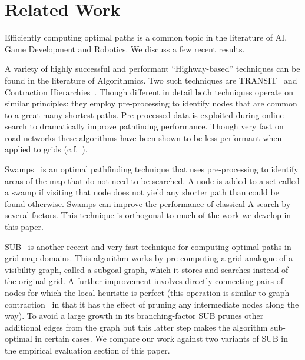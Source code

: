 \section{Related Work}
\label{sec::relatedwork}
Efficiently computing optimal paths is a common topic
in the literature of AI, Game Development and 
Robotics. We discuss a few recent results.

A variety of highly successful and performant ``Highway-based'' 
techniques can be found in the literature of Algorithmics. 
Two such techniques are TRANSIT~\cite{bast06} and Contraction
Hierarchies~\cite{geisberger08}. Though different in detail
both techniques operate on similar principles: they employ
pre-processing to identify nodes that
are common to a great many shortest paths. Pre-processed data is
exploited during online search to dramatically improve pathfindng 
performance. Though very fast on road networks these algorithms have
been shown to be less performant when applied to grids 
(c.f.~\cite{sturtevant10,antsfeld12,storandt13}).

Swamps~\cite{pochter10} is an optimal pathfinding technique
that uses pre-processing to identify areas of the map that do 
not need to be searched. A node is added to a set called a swamp
if visiting that node does not yield any shorter path than could
be found otherwise. Swamps can improve the performance of classical
A\* search by several factors. This technique is orthogonal to much
of the work we develop in this paper.

SUB~\cite{urasKH13} is another recent and very fast technique 
for computing optimal paths in grid-map domains. 
This algorithm works by pre-computing a grid analogue of a visibility graph,
called a subgoal graph, which it stores and searches instead of the original
grid.
A further improvement involves directly connecting pairs of nodes
for which the local heuristic is perfect (this operation is similar 
to graph contraction~\cite{geisberger08} in that it has the effect of 
pruning any intermediate nodes along the way).
To avoid a large growth in its branching-factor SUB prunes other 
additional edges from the graph but this latter step makes the 
algorithm sub-optimal in certain cases. We compare our work against
two variants of SUB in the empirical evaluation section of this paper.

%
